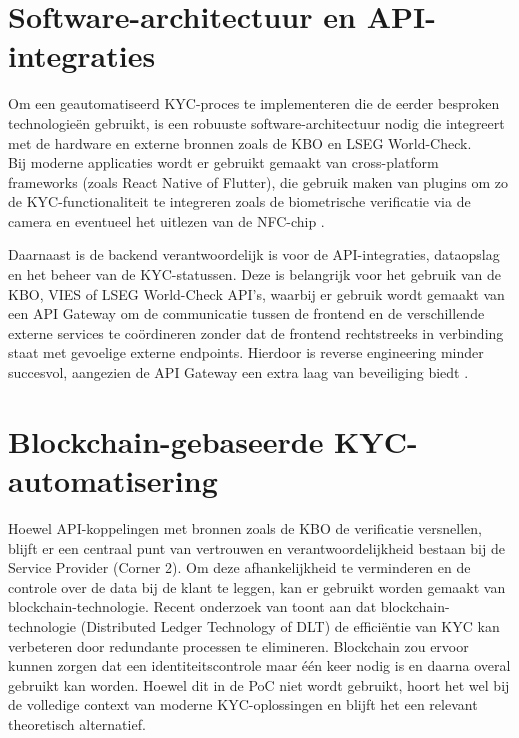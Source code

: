 \section{Software-architectuur en API-integraties}
Om een geautomatiseerd KYC-proces te implementeren die de eerder besproken technologieën gebruikt, is een robuuste software-architectuur nodig die 
integreert met de hardware en externe bronnen zoals de KBO en LSEG World-Check. \\ Bij moderne applicaties wordt er gebruikt gemaakt van cross-platform frameworks (zoals React Native of Flutter), 
die gebruik maken van plugins om zo de KYC-functionaliteit te integreren zoals de biometrische verificatie via de camera en eventueel het uitlezen van de NFC-chip \autocite{FlutterArch2024}.

Daarnaast is de backend verantwoordelijk is voor de API-integraties, dataopslag en het beheer van de KYC-statussen.
Deze is belangrijk voor het gebruik van de KBO, VIES of LSEG World-Check API's, waarbij er gebruik wordt gemaakt van een API Gateway om de communicatie tussen de frontend en de verschillende externe services te coördineren
zonder dat de frontend rechtstreeks in verbinding staat met gevoelige externe endpoints. Hierdoor is reverse engineering minder succesvol, aangezien de API Gateway een extra laag van beveiliging biedt \autocite{MicrosoftMicroservices2024}.

\section{Blockchain-gebaseerde KYC-automatisering}
Hoewel API-koppelingen met bronnen zoals de KBO de verificatie versnellen, blijft er een centraal punt van vertrouwen en verantwoordelijkheid bestaan bij de Service Provider (Corner 2).
Om deze afhankelijkheid te verminderen en de controle over de data bij de klant te leggen, kan er gebruikt worden gemaakt van blockchain-technologie.
Recent onderzoek van \autocite{Malhotra2022} toont aan dat blockchain-technologie (Distributed Ledger Technology of DLT) de efficiëntie van KYC kan verbeteren door redundante processen te elimineren.
Blockchain zou ervoor kunnen zorgen dat een identiteitscontrole maar één keer nodig is en daarna overal gebruikt kan worden. Hoewel dit in de PoC niet wordt gebruikt, hoort het wel bij de volledige context van moderne KYC-oplossingen
en blijft het een relevant theoretisch alternatief.

